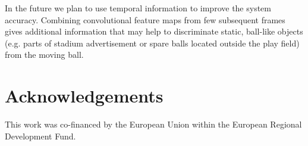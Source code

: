 \documentclass[a4paper,twoside]{article}
\begin{document}
In the future we plan to use temporal information to improve the system accuracy. Combining convolutional feature maps from few subsequent frames gives additional information that may help to discriminate static, ball-like objects (e.g. parts of stadium advertisement or spare balls located outside the play field) from the moving ball.



\section*{Acknowledgements}
This work was co-financed by the European Union within the European Regional Development Fund.


{\small
}

\vfill
\end{document}
